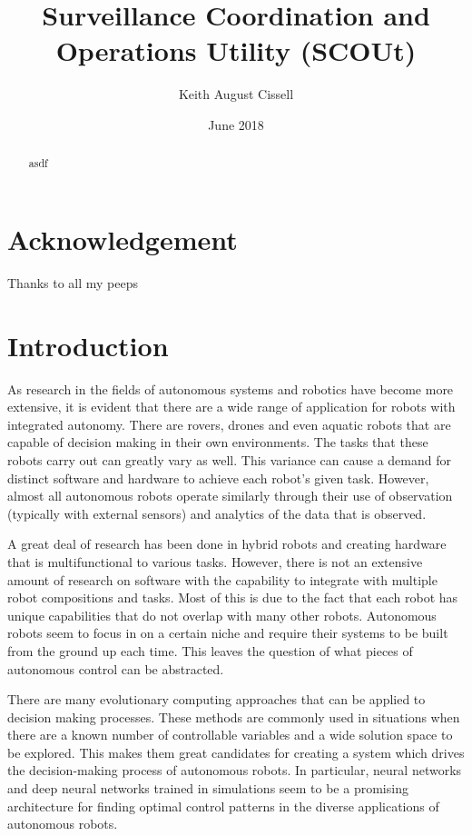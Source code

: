 \documentclass[]{report}
\begin{document}
\title{Surveillance Coordination and Operations Utility (SCOUt)}
\author{Keith August Cissell}
\date{June 2018}

\maketitle

\begin{abstract}
  asdf
\end{abstract}

\section*{Acknowledgement}
Thanks to all my peeps

\tableofcontents
\newpage



\section{Introduction}
As research in the fields of autonomous systems and robotics have become more extensive, it is evident that there are a wide range of application for robots with integrated autonomy.  There are rovers, drones and even aquatic robots that are capable of decision making in their own environments. The tasks that these robots carry out can greatly vary as well. This variance can cause a demand for distinct software and hardware to achieve each robot’s given task. However, almost all autonomous robots operate similarly through their use of observation (typically with external sensors) and analytics of the data that is observed.

A great deal of research has been done in hybrid robots and creating hardware that is multifunctional to various tasks. However, there is not an extensive amount of research on software with the capability to integrate with multiple robot compositions and tasks. Most of this is due to the fact that each robot has unique capabilities that do not overlap with many other robots. Autonomous robots seem to focus in on a certain niche and require their systems to be built from the ground up each time. This leaves the question of what pieces of autonomous control can be abstracted.

There are many evolutionary computing approaches that can be applied to decision making processes. These methods are commonly used in situations when there are a known number of controllable variables and a wide solution space to be explored. This makes them great candidates for creating a system which drives the decision-making process of autonomous robots. In particular, neural networks and deep neural networks trained in simulations seem to be a promising architecture for finding optimal control patterns in the diverse applications of autonomous robots.
\end{document}
